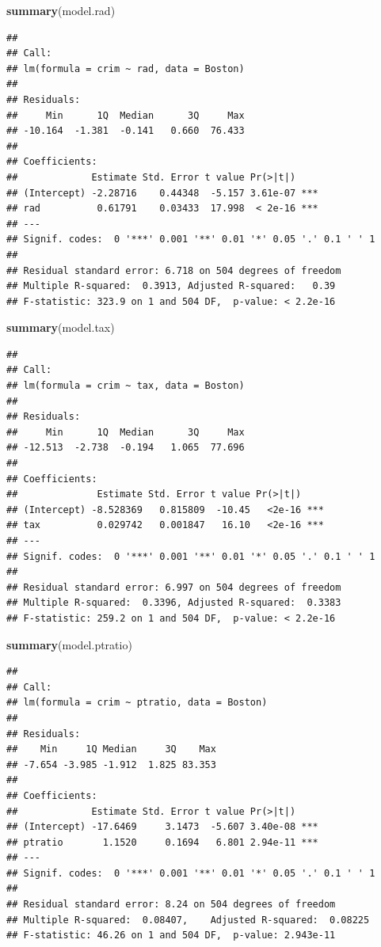 \documentclass[]{article}
\newenvironment{Shaded}{\begin{snugshade}}{\end{snugshade}}
\newcommand{\KeywordTok}[1]{\textcolor[rgb]{0.13,0.29,0.53}{\textbf{#1}}}
\newcommand{\NormalTok}[1]{#1}
\begin{document}
\begin{Shaded}
\begin{Highlighting}[]
\KeywordTok{summary}\NormalTok{(model.rad)}
\end{Highlighting}
\end{Shaded}

\begin{verbatim}
## 
## Call:
## lm(formula = crim ~ rad, data = Boston)
## 
## Residuals:
##     Min      1Q  Median      3Q     Max 
## -10.164  -1.381  -0.141   0.660  76.433 
## 
## Coefficients:
##             Estimate Std. Error t value Pr(>|t|)    
## (Intercept) -2.28716    0.44348  -5.157 3.61e-07 ***
## rad          0.61791    0.03433  17.998  < 2e-16 ***
## ---
## Signif. codes:  0 '***' 0.001 '**' 0.01 '*' 0.05 '.' 0.1 ' ' 1
## 
## Residual standard error: 6.718 on 504 degrees of freedom
## Multiple R-squared:  0.3913, Adjusted R-squared:   0.39 
## F-statistic: 323.9 on 1 and 504 DF,  p-value: < 2.2e-16
\end{verbatim}

\begin{Shaded}
\begin{Highlighting}[]
\KeywordTok{summary}\NormalTok{(model.tax)}
\end{Highlighting}
\end{Shaded}

\begin{verbatim}
## 
## Call:
## lm(formula = crim ~ tax, data = Boston)
## 
## Residuals:
##     Min      1Q  Median      3Q     Max 
## -12.513  -2.738  -0.194   1.065  77.696 
## 
## Coefficients:
##              Estimate Std. Error t value Pr(>|t|)    
## (Intercept) -8.528369   0.815809  -10.45   <2e-16 ***
## tax          0.029742   0.001847   16.10   <2e-16 ***
## ---
## Signif. codes:  0 '***' 0.001 '**' 0.01 '*' 0.05 '.' 0.1 ' ' 1
## 
## Residual standard error: 6.997 on 504 degrees of freedom
## Multiple R-squared:  0.3396, Adjusted R-squared:  0.3383 
## F-statistic: 259.2 on 1 and 504 DF,  p-value: < 2.2e-16
\end{verbatim}

\begin{Shaded}
\begin{Highlighting}[]
\KeywordTok{summary}\NormalTok{(model.ptratio)}
\end{Highlighting}
\end{Shaded}

\begin{verbatim}
## 
## Call:
## lm(formula = crim ~ ptratio, data = Boston)
## 
## Residuals:
##    Min     1Q Median     3Q    Max 
## -7.654 -3.985 -1.912  1.825 83.353 
## 
## Coefficients:
##             Estimate Std. Error t value Pr(>|t|)    
## (Intercept) -17.6469     3.1473  -5.607 3.40e-08 ***
## ptratio       1.1520     0.1694   6.801 2.94e-11 ***
## ---
## Signif. codes:  0 '***' 0.001 '**' 0.01 '*' 0.05 '.' 0.1 ' ' 1
## 
## Residual standard error: 8.24 on 504 degrees of freedom
## Multiple R-squared:  0.08407,    Adjusted R-squared:  0.08225 
## F-statistic: 46.26 on 1 and 504 DF,  p-value: 2.943e-11
\end{verbatim}
\end{document}
